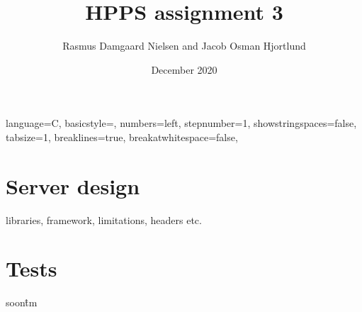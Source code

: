 \documentclass{article}
\title{HPPS assignment 3}
\author{Rasmus Damgaard Nielsen and Jacob Osman Hjortlund}
\date{December 2020}
\begin{document}
\lstset
{ %
    language=C,
    basicstyle=\footnotesize,
    numbers=left,
    stepnumber=1,
    showstringspaces=false,
    tabsize=1,
    breaklines=true,
    breakatwhitespace=false,
}
\maketitle

\section{Server design}

libraries, framework, limitations, headers etc.

\section{Tests}
soon\^tm
\end{document}
